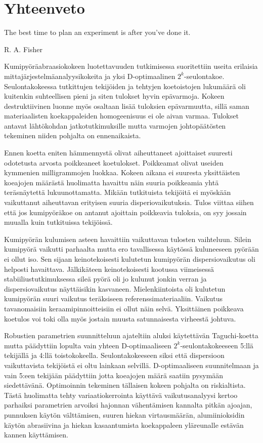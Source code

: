 \documentclass[12pt,a4paper,finnish]{tutthesis}
\begin{document}
\chapter{Yhteenveto}
\label{ch:concl}

\epigraph{The best time to plan an experiment is after you’ve done it.}{R. A. Fisher}

Kumipyöräabraasiokokeen luotettavuuden tutkimisessa suoritettiin
useita erilaisia mittajärjestelmäanalyysikokeita ja yksi
D-optimaalinen $2^k$-seulontakoe. Seulontakokeessa tutkittujen tekijöiden ja tehtyjen
koetoistojen lukumäärä oli kuitenkin suhteellisen pieni
ja siten tulokset hyvin epävarmoja.
Kokeen destruktiivinen luonne myös osaltaan lisää tuloksien
epävarmuutta, sillä saman materiaalisten koekappaleiden homogeenisuus
ei ole aivan varmaa.
Tulokset antavat lähtökohdan jatkotutkimuksille mutta varmojen
johtopäätösten tekeminen niiden pohjalta on ennenaikaista.

Ennen koetta eniten hämmennystä olivat aiheuttaneet ajoittaiset suuresti odotetusta
arvosta poikkeaneet koetulokset. Poikkeamat olivat useiden kymmenien
milligrammojen luokkaa. Kokeen aikana ei suuresta yksittäisten koeajojen määrästä
huolimatta havaittu näin suuria poikkeamia yhtä teräsnäytettä lukuunottamatta.
Mikään tutkituista tekijöitä ei myöskään vaikuttanut aiheuttavan
erityisen suuria disperiovaikutuksia. Tulos viittaa siihen että jos kumipyöräkoe
on antanut ajoittain poikkeavia tuloksia, on syy jossain muualla kuin tutkituissa
tekijöissä.

Kumipyörän kulumisen asteen havaittiin vaikuttavan tulosten vaihteluun.
Silein kumipyörä vaikutti parhaalta mutta ero tavallisessa käytössä kuluneeseen
pyörään ei ollut iso. Sen sijaan keinotekoisesti kulutetun kumipyörän dispersiovaikutus
oli helposti havaittava. Jälkikäteen keinotekoisesti kootussa viimeisessä stabiiliustutkimuksessa
sileä pyörä oli jo kulunut jonkin verran ja dispersiovaikutus näyttäisikin kasvaneen.
Mielenkiintoista oli kulutetun kumipyörän suuri vaikutus teräksiseen referenssimateriaaliin.
Vaikutus tavanomaisiin keraamipinnoitteisiin ei ollut näin selvä. Yksittäinen poikkeava
koetulos voi toki olla myös jostain muusta satunnaisesta virheestä johtuva.

Robustien parametrien suunnitteluun ajateltiin aluksi käytettävän
Taguchi-koetta mutta päädyttiin lopulta vain yhteen D-optimaaliseen
$2^k$-seulontakokeeseen 5:llä tekijällä ja 4:llä toistokokeella.
Seulontakokeeseen siksi että dispersioon
vaikuttavista tekijöistä ei oltu lainkaan selvillä. D-optimaaliseen suunnitelmaan
ja vain 5:een tekijään päädyttiin jotta koeajojen määrä saatiin pysymään
siedettävänä. Optimoinnin tekeminen tällaisen kokeen pohjalta on
riskialtista. Tästä huolimatta tehty variaatiokerrointa käyttävä vaikutusanalyysi kertoo parhaiksi parametrien arvoiksi hajonnan vähentämisen kannalta pitkän ajoajan, punnuksen käytön välttämisen, suuren hiekan virtausmäärän, alumiinioksidin käytön abrasiivina ja hiekan kasaantumista koekappaleen yläreunalle estävän kannen käyttämisen.
\end{document}
